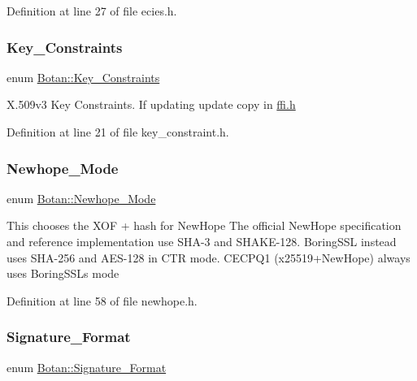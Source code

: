 Definition at line 27 of file ecies.\+h.

\mbox{\label{namespace_botan_aed0885e5c70627dd43827b966e727654}} 
\subsubsection{\texorpdfstring{Key\+\_\+\+Constraints}{Key\_Constraints}}
{\footnotesize\ttfamily enum \mbox{\hyperlink{namespace_botan_aed0885e5c70627dd43827b966e727654}{Botan\+::\+Key\+\_\+\+Constraints}}}

X.\+509v3 Key Constraints. If updating update copy in \mbox{\hyperlink{ffi_8h_source}{ffi.\+h}} 

Definition at line 21 of file key\+\_\+constraint.\+h.

\mbox{\label{namespace_botan_a42a70d7cfb95e4f7773d3b52dc98ad61}} 
\subsubsection{\texorpdfstring{Newhope\+\_\+\+Mode}{Newhope\_Mode}}
{\footnotesize\ttfamily enum \mbox{\hyperlink{namespace_botan_a42a70d7cfb95e4f7773d3b52dc98ad61}{Botan\+::\+Newhope\+\_\+\+Mode}}\hspace{0.3cm}{\ttfamily [strong]}}

This chooses the X\+OF + hash for New\+Hope The official New\+Hope specification and reference implementation use S\+H\+A-\/3 and S\+H\+A\+K\+E-\/128. Boring\+S\+SL instead uses S\+H\+A-\/256 and A\+E\+S-\/128 in C\+TR mode. C\+E\+C\+P\+Q1 (x25519+\+New\+Hope) always uses Boring\+S\+SL\textquotesingle{}s mode 

Definition at line 58 of file newhope.\+h.

\mbox{\label{namespace_botan_ad8a9578625edf847cbcba3ae15648cda}} 
\subsubsection{\texorpdfstring{Signature\+\_\+\+Format}{Signature\_Format}}
{\footnotesize\ttfamily enum \mbox{\hyperlink{namespace_botan_ad8a9578625edf847cbcba3ae15648cda}{Botan\+::\+Signature\+\_\+\+Format}}}

